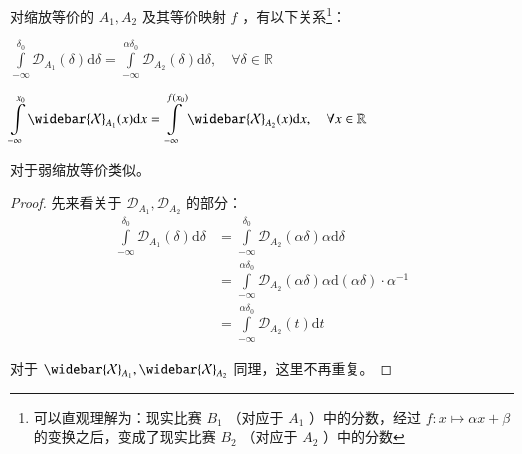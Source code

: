         \begin{proposition}[缩放等价的实际含义]
            对缩放等价的 $A_1,A_2$ 及其等价映射 $f$ ，有以下关系\footnote{可以直观理解为：现实比赛 $B_1$ （对应于 $A_1$ ）中的分数，经过 $f:x\mapsto\alpha x+\beta$ 的变换之后，变成了现实比赛 $B_2$ （对应于 $A_2$ ）中的分数}：
            \begin{asparaenum}
                \item $\displaystyle\int\limits_{-\infty}^{\delta_0} \mathcal{D}_{A_1}(\delta)\mathrm{d}\delta=\displaystyle\int\limits_{-\infty}^{\alpha\delta_0} \mathcal{D}_{A_2}(\delta)\mathrm{d}\delta,\quad\forall\delta\in\mathbb{R}$
                \item $\displaystyle\int\limits_{-\infty}^{x_0} \widebar{\mathcal{X}}_{A_1}(x)\mathrm{d}x=\displaystyle\int\limits_{-\infty}^{f(x_0)} \widebar{\mathcal{X}}_{A_2}(x)\mathrm{d}x,\quad\forall x\in\mathbb{R}$
            \end{asparaenum}

            对于弱缩放等价类似。

            \label{prop:equivalenceAfterScalingMeaning}
        \end{proposition}

        \begin{proof}
            先来看关于 $\mathcal{D}_{A_1},\mathcal{D}_{A_2}$ 的部分：
            \begin{align*}
                \int\limits_{-\infty}^{\delta_0} \mathcal{D}_{A_1}(\delta)\mathrm{d}\delta 
                &=\int\limits_{-\infty}^{\delta_0} \mathcal{D}_{A_2}(\alpha\delta)\alpha\mathrm{d}\delta \\
                &=\int\limits_{-\infty}^{\alpha\delta_0} \mathcal{D}_{A_2}(\alpha\delta)\alpha \mathrm{d}(\alpha\delta)\cdot\alpha^{-1} \\
                &=\int\limits_{-\infty}^{\alpha\delta_0}\mathcal{D}_{A_2}(t)\mathrm{d}t
            \end{align*}

            对于 $\widebar{\mathcal{X}}_{A_1},\widebar{\mathcal{X}}_{A_2}$ 同理，这里不再重复。
        \end{proof}


